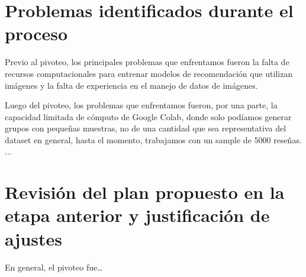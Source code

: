 \documentclass[11pt]{article}
\begin{document}

\section{Problemas identificados durante el proceso} 

Previo al pivoteo, los principales problemas que enfrentamos fueron la falta de recursos computacionales para entrenar modelos de recomendación que utilizan imágenes y la falta de experiencia en el manejo de datos de imágenes. %

Luego del pivoteo, los problemas que enfrentamos fueron, por una parte, la capacidad limitada de cómputo de Google Colab, donde solo podíamos generar grupos con pequeñas muestras, no de una cantidad que sea representativa del dataset en general, hasta el momento, trabajamos con un sample de 5000 reseñas. ... %

\section{Revisión del plan propuesto en la etapa anterior y justificación de ajustes} 

En general, el pivoteo fue\dots %
\end{document}
